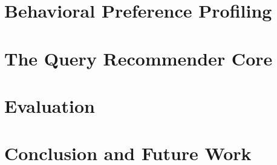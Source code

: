\documentclass[a4paper,11pt]{report}
\begin{document}
\chapter{Behavioral Preference Profiling}\label{ch:behavior}
    

\chapter{The Query Recommender Core}\label{ch:recommender}
    

\chapter{Evaluation}\label{ch:eval}
    

\chapter{Conclusion and Future Work}\label{ch:conclusion}
    



\end{document}
